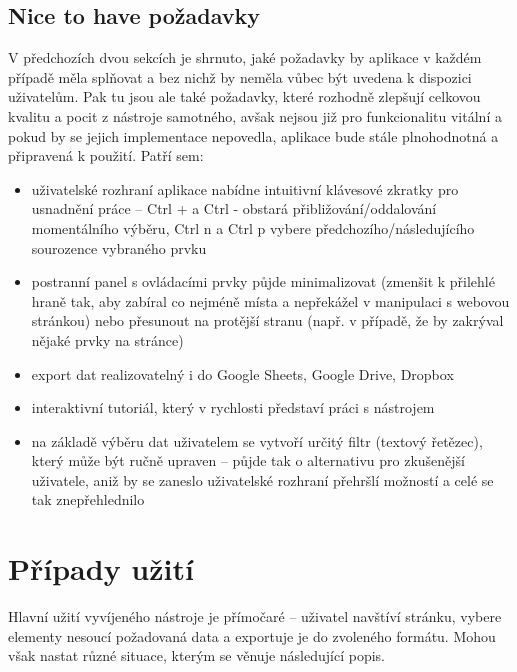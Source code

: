 \documentclass[thesis=B,czech]{FITthesis}[2012/06/26]
\begin{document}
\subsection{Nice to have požadavky}
V předchozích dvou sekcích je shrnuto, jaké požadavky by aplikace v každém případě měla splňovat a bez nichž by neměla vůbec být uvedena k dispozici uživatelům. Pak tu jsou ale také požadavky, které rozhodně zlepšují celkovou kvalitu a pocit z nástroje samotného, avšak nejsou již pro funkcionalitu vitální a pokud by se jejich implementace nepovedla, aplikace bude stále plnohodnotná a připravená k použití. Patří sem:
\begin{itemize}
	\item uživatelské rozhraní aplikace nabídne intuitivní klávesové zkratky pro usnadnění práce -- \textsf{Ctrl +} a \textsf{Ctrl -} obstará přibližování/oddalování momentálního výběru, \textsf{Ctrl n} a \textsf{Ctrl p} vybere předchozího/následujícího sourozence vybraného prvku
	\item postranní panel s ovládacími prvky půjde minimalizovat (zmenšit k přilehlé hraně tak, aby zabíral co nejméně místa a nepřekážel v manipulaci s webovou stránkou) nebo přesunout na protější stranu (např. v případě, že by zakrýval nějaké prvky na stránce)
	\item export dat realizovatelný i do Google Sheets, Google Drive, Dropbox
	\item interaktivní tutoriál, který v rychlosti představí práci s nástrojem
	\item na základě výběru dat uživatelem se vytvoří určitý filtr (textový řetězec), který může být ručně upraven -- půjde tak o alternativu pro zkušenější uživatele, aniž by se zaneslo uživatelské rozhraní přehršlí možností a celé se tak znepřehlednilo
\end{itemize}


\section{Případy užití}
Hlavní užití vyvíjeného nástroje je přímočaré -- uživatel navštíví stránku, vybere elementy nesoucí požadovaná data a exportuje je do zvoleného formátu. Mohou však nastat různé situace, kterým se věnuje následující popis.
\end{document}
